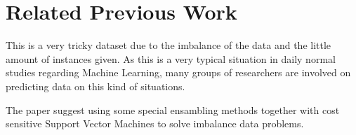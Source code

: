 \section{Related Previous Work}

This is a very tricky dataset due to the imbalance of the data and the little amount of instances given. As this is a very typical situation in daily normal studies regarding Machine Learning, many groups of researchers are involved on predicting data on this kind of situations.

The paper \cite{zieba2013boosted} suggest using some special ensambling methods together with cost sensitive Support Vector Machines to solve imbalance data problems.

%
%

